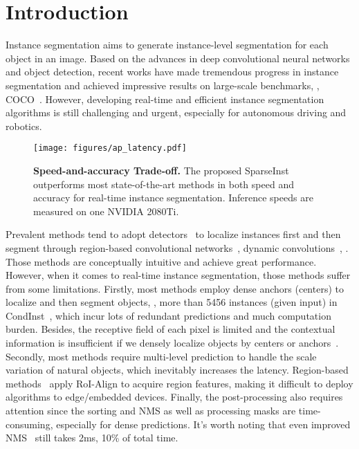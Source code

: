 \documentclass[10pt,twocolumn,letterpaper]{article}
\begin{document}
\section{Introduction}
\let\thefootnote\relax{}

Instance segmentation aims to generate instance-level segmentation for each object in an image. Based on the advances in deep convolutional neural networks and object detection, recent works \cite{MaskRCNNHeGDG17,MSRCNNHuangHGHW19,HTCChenPWXLSF0SOLL19,BMaskChengWH020,SOLOWangKSJL20} have made tremendous progress in instance segmentation and achieved impressive results on large-scale benchmarks, \eg, COCO~\cite{COCOLinMBHPRDZ14}. However, developing real-time and efficient instance segmentation algorithms is still challenging and urgent, especially for autonomous driving and robotics.

\begin{figure}
\centering
\texttt{[image: figures/ap\_latency.pdf]}
\caption{\textbf{Speed-and-accuracy Trade-off.} The proposed SparseInst outperforms most state-of-the-art methods in both speed and accuracy for real-time instance segmentation. Inference speeds are measured on one NVIDIA 2080Ti.}
\label{fig:ap_latency}
\vspace{-16pt}
\end{figure}

Prevalent methods tend to adopt detectors~\cite{FRCNNRenHG017,FCOSTianSCH19} to localize instances first and then segment through region-based convolutional networks~\cite{MaskRCNNHeGDG17}, dynamic convolutions~\cite{TianSC20}, \etc.
Those methods are conceptually intuitive and achieve great performance.
However, when it comes to real-time instance segmentation, those methods suffer from some limitations.
Firstly, most methods employ dense anchors (centers) to localize and then segment objects, \eg, more than 5456 instances (given  input) in CondInst~\cite{TianSC20}, which incur lots of redundant predictions and much computation burden.
Besides, the receptive field of each pixel is limited and the contextual information is insufficient if we densely localize objects by centers or anchors~\cite{yolofabs-2103-09460,DensePointsYangXXZUWLH20}.
Secondly, most methods require multi-level prediction to handle the scale variation of natural objects, which inevitably increases the latency.
Region-based methods~\cite{MaskRCNNHeGDG17} apply RoI-Align to acquire region features, making it difficult to deploy algorithms to edge/embedded devices.
Finally, the post-processing also requires attention since the sorting and NMS as well as processing masks are time-consuming, especially for dense predictions. It's worth noting that even improved NMS~\cite{YolactBolyaZXL19,SOLOV2WangZKLS20} still takes  2ms, 10\% of total time.
\end{document}
